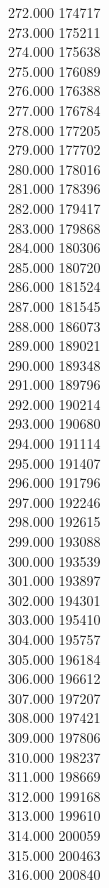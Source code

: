 { 272.000	174717 \\
 273.000	175211 \\
 274.000	175638 \\
 275.000	176089 \\
 276.000	176388 \\
 277.000	176784 \\
 278.000	177205 \\
 279.000	177702 \\
 280.000	178016 \\
 281.000	178396 \\
 282.000	179417 \\
 283.000	179868 \\
 284.000	180306 \\
 285.000	180720 \\
 286.000	181524 \\
 287.000	181545 \\
 288.000	186073 \\
 289.000	189021 \\
 290.000	189348 \\
 291.000	189796 \\
 292.000	190214 \\
 293.000	190680 \\
 294.000	191114 \\
 295.000	191407 \\
 296.000	191796 \\
 297.000	192246 \\
 298.000	192615 \\
 299.000	193088 \\
 300.000	193539 \\
 301.000	193897 \\
 302.000	194301 \\
 303.000	195410 \\
 304.000	195757 \\
 305.000	196184 \\
 306.000	196612 \\
 307.000	197207 \\
 308.000	197421 \\
 309.000	197806 \\
 310.000	198237 \\
 311.000	198669 \\
 312.000	199168 \\
 313.000	199610 \\
 314.000	200059 \\
 315.000	200463 \\
 316.000	200840 \\
}

